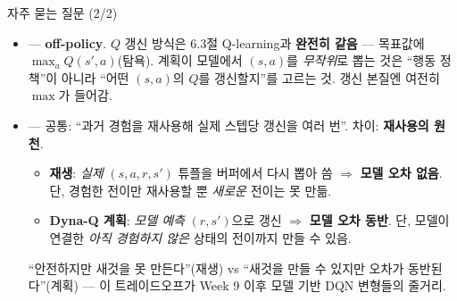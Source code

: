 \begin{frame}{자주 묻는 질문 (2/2)}
  \begin{itemize}
    \item {}
      --- \textbf{off-policy}. $Q$ 갱신 방식은 6.3절 Q-learning과
      \textbf{완전히 같음} --- 목표값에 $\max_a Q(s',a)$(탐욕).
      계획이 모델에서 $(s,a)$를 \textit{무작위}로 뽑는 것은
      ``행동 정책''이 아니라 ``어떤 $(s,a)$의 $Q$를 갱신할지''를
      고르는 것. 갱신 본질엔 여전히 $\max$가 들어감.
    \item {}
      --- 공통: ``과거 경험을 재사용해 실제 스텝당 갱신을 여러
      번''. 차이: \textbf{재사용의 원천}.
      \begin{itemize}
        \item \textbf{재생}: \textit{실제} $(s,a,r,s')$ 튜플을
          버퍼에서 다시 뽑아 씀 $\Rightarrow$ \textbf{모델 오차
          없음}. 단, 경험한 전이만 재사용할 뿐 \textit{새로운}
          전이는 못 만듦.
        \item \textbf{Dyna-Q 계획}: \textit{모델 예측} $(r,s')$으로
          갱신 $\Rightarrow$ \textbf{모델 오차 동반}. 단, 모델이
          연결한 \textit{아직 경험하지 않은} 상태의 전이까지
          만들 수 있음.
      \end{itemize}
      ``안전하지만 새것을 못 만든다''(재생) vs ``새것을 만들 수
      있지만 오차가 동반된다''(계획) --- 이 트레이드오프가
      Week 9 이후 모델 기반 DQN 변형들의 줄거리.
  \end{itemize}
\end{frame}

